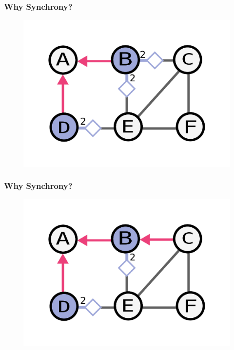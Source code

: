\documentclass{beamer}
\begin{document}
\begin{frame}
    \frametitle{Why Synchrony?}
    \begin{figure}
    \includegraphics[width=0.5\paperwidth]{round2.pdf}
    \end{figure}
\end{frame}


\begin{frame}
    \frametitle{Why Synchrony?}
    \begin{figure}
    \includegraphics[width=0.5\paperwidth]{round2-fuckup-end.pdf}
    \end{figure}
\end{frame}
\end{document}
